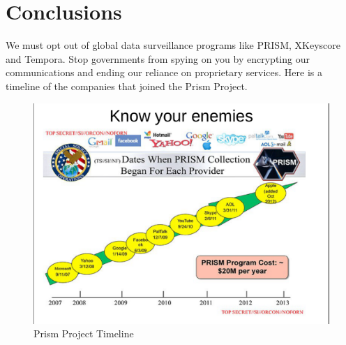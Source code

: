 \documentclass[11pt]{book}
\begin{document}
\chapter{Conclusions}
We must opt out of global data surveillance programs like PRISM, XKeyscore and Tempora. Stop governments from spying on you by encrypting our communications and ending our reliance on proprietary services.
Here is a timeline of the companies that joined the Prism Project.
\begin{figure}[ht!]
	\centering
	\includegraphics[width=150mm]{prism1.png}
	\caption{Prism Project Timeline}
	\label{overflow}
\end{figure}
\newpage
\end{document}
